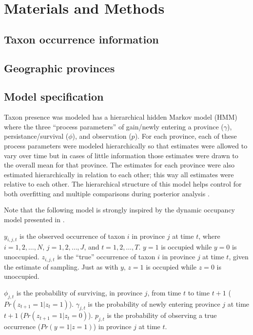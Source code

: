 \documentclass[12pt,letterpaper]{article}
\begin{document}
\section{Materials and Methods}

\subsection{Taxon occurrence information}

\subsection{Geographic provinces}

\subsection{Model specification}
Taxon presence was modeled has a hierarchical hidden Markov model (HMM) where the three ``process parameters'' of gain/newly entering a province (\(\gamma\)), persistance/survival (\(\phi\)), and observation (\(p\)). For each province, each of these process parameters were modeled hierarchically so that estimates were allowed to vary over time but in cases of little information those estimates were drawn to the overall mean for that province. The estimates for each province were also estimated hierarchically in relation to each other; this way all estimates were relative to each other. The hierarchical structure of this model helps control for both overfitting and multiple comparisons during posterior analysis \citep{Gelman2007,Gelman2013d}. 

Note that the following model is strongly inspired by the dynamic occupancy model presented in \citep{Royle2008}.

\(y_{i, j, t}\) is the observed occurrence of taxon \(i\) in province \(j\) at time \(t\), where \(i = 1, 2, \dots, N\), \(j = 1, 2, \dots, J\), and \(t = 1, 2, \dots, T\). \(y = 1\) is occupied while \(y = 0\) is unoccupied. \(z_{i, j, t}\) is the ``true'' occurrence of taxon \(i\) in province \(j\) at time \(t\), given the estimate of sampling. Just as with \(y\), \(z = 1\) is occupied while \(z = 0\) is unoccupied. 

\(\phi_{j, t}\) is the probability of surviving, in province \(j\), from time \(t\) to time \(t + 1\) (\(Pr(z_{t + 1} = 1 | z_{t} = 1)\)). \(\gamma_{j, t}\) is the probability of newly entering province \(j\) at time \(t + 1\) (\(Pr(z_{t + 1} = 1 | z_{t} = 0)\)). \(p_{j, t}\) is the probability of observing a true occurrence (\(Pr(y = 1 | z = 1)\)) in province \(j\) at time \(t\). 
\end{document}
